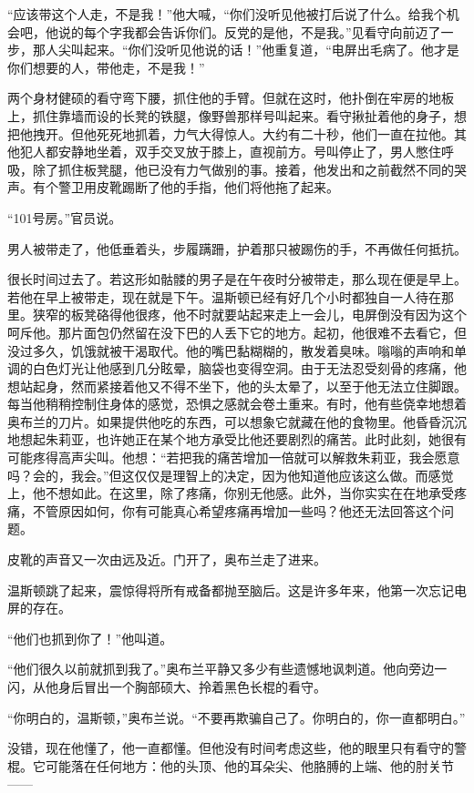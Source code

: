 ``应该带这个人走，不是我！''他大喊，``你们没听见他被打后说了什么。给我个机会吧，他说的每个字我都会告诉你们。反党的是他，不是我。''见看守向前迈了一步，那人尖叫起来。``你们没听见他说的话！''他重复道，``电屏出毛病了。他才是你们想要的人，带他走，不是我！''

两个身材健硕的看守弯下腰，抓住他的手臂。但就在这时，他扑倒在牢房的地板上，抓住靠墙而设的长凳的铁腿，像野兽那样号叫起来。看守揪扯着他的身子，想把他拽开。但他死死地抓着，力气大得惊人。大约有二十秒，他们一直在拉他。其他犯人都安静地坐着，双手交叉放于膝上，直视前方。号叫停止了，男人憋住呼吸，除了抓住板凳腿，他已没有力气做别的事。接着，他发出和之前截然不同的哭声。有个警卫用皮靴踢断了他的手指，他们将他拖了起来。

``101号房。''官员说。

男人被带走了，他低垂着头，步履蹒跚，护着那只被踢伤的手，不再做任何抵抗。

很长时间过去了。若这形如骷髅的男子是在午夜时分被带走，那么现在便是早上。若他在早上被带走，现在就是下午。温斯顿已经有好几个小时都独自一人待在那里。狭窄的板凳硌得他很疼，他不时就要站起来走上一会儿，电屏倒没有因为这个呵斥他。那片面包仍然留在没下巴的人丢下它的地方。起初，他很难不去看它，但没过多久，饥饿就被干渴取代。他的嘴巴黏糊糊的，散发着臭味。嗡嗡的声响和单调的白色灯光让他感到几分眩晕，脑袋也变得空洞。由于无法忍受刻骨的疼痛，他想站起身，然而紧接着他又不得不坐下，他的头太晕了，以至于他无法立住脚跟。每当他稍稍控制住身体的感觉，恐惧之感就会卷土重来。有时，他有些侥幸地想着奥布兰的刀片。如果提供他吃的东西，可以想象它就藏在他的食物里。他昏昏沉沉地想起朱莉亚，也许她正在某个地方承受比他还要剧烈的痛苦。此时此刻，她很有可能疼得高声尖叫。他想：``若把我的痛苦增加一倍就可以解救朱莉亚，我会愿意吗？会的，我会。''但这仅仅是理智上的决定，因为他知道他应该这么做。而感觉上，他不想如此。在这里，除了疼痛，你别无他感。此外，当你实实在在地承受疼痛，不管原因如何，你有可能真心希望疼痛再增加一些吗？他还无法回答这个问题。

皮靴的声音又一次由远及近。门开了，奥布兰走了进来。

温斯顿跳了起来，震惊得将所有戒备都抛至脑后。这是许多年来，他第一次忘记电屏的存在。

``他们也抓到你了！''他叫道。

``他们很久以前就抓到我了。''奥布兰平静又多少有些遗憾地讽刺道。他向旁边一闪，从他身后冒出一个胸部硕大、拎着黑色长棍的看守。

``你明白的，温斯顿，''奥布兰说。``不要再欺骗自己了。你明白的，你一直都明白。''

没错，现在他懂了，他一直都懂。但他没有时间考虑这些，他的眼里只有看守的警棍。它可能落在任何地方：他的头顶、他的耳朵尖、他胳膊的上端、他的肘关节——

